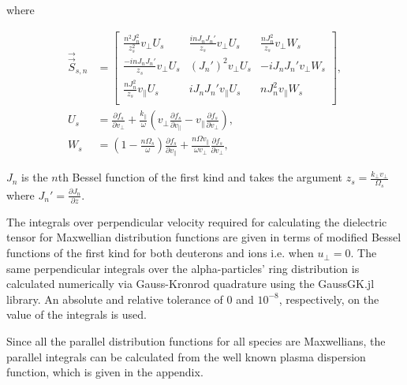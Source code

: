 \documentclass[12pt]{iopart}
\begin{document}
\noindent where

\begin{align}
\vec{\vec{S}}_{s,n} &=
\begin{bmatrix}
\frac{n^2J_n^2}{z_s^2}v_\perp U_s & \frac{inJ_nJ_n'}{z_s}v_\perp U_s & \frac{n J_n^2}{z_s} v_\perp W_s \\
\frac{-inJ_nJ_n'}{z_s}v_\perp U_s & (J_n')^2 v_\perp U_s & -iJ_n J_n' v_\perp W_s \\
\frac{nJ_n^2}{z_s}v_\parallel U_s & iJ_nJ_n'v_\parallel U_s & n J_n^2 v_\parallel W_s \\
\end{bmatrix}\label{eq:stenor},\\
U_s &= \frac{\partial f_s}{\partial v_\perp} + \frac{k_\parallel}{\omega}  \left(v_\perp \frac{\partial f_s}{\partial v_\parallel} - v_\parallel \frac{\partial f_s}{\partial v_\perp}\right)\label{eq:uterm},\\
W_s &=\left(1- \frac{n\Omega_s}{\omega}\right)\frac{\partial f_s}{\partial v_\parallel} + \frac{n\Omega v_\parallel}{\omega v_\perp}\frac{\partial f_s}{\partial v_\perp}\label{eq:wterm},
\end{align}

\noindent $J_n$ is the $n$th Bessel function of the first kind and takes the argument $z_s=\frac{k_\perp v_\perp}{\Omega_s}$ where $J_n'=\frac{\partial J_n}{\partial z}$.

The integrals over perpendicular velocity required for calculating the dielectric tensor for Maxwellian distribution functions are given in terms of modified Bessel functions of the first kind for both deuterons and ions i.e. when $u_\perp =0$. The same perpendicular integrals over the alpha-particles' ring distribution is calculated numerically via Gauss-Kronrod\cite{Kronrod1965} quadrature using the GaussGK.jl\cite{QuadGK} library. An absolute and relative tolerance of $0$ and $10^{-8}$, respectively, on the value of the integrals is used. 

Since all the parallel distribution functions for all species are Maxwellians, the parallel integrals can be calculated from the well known plasma dispersion function\cite{Fried1961}, which is given in the appendix.
\end{document}

